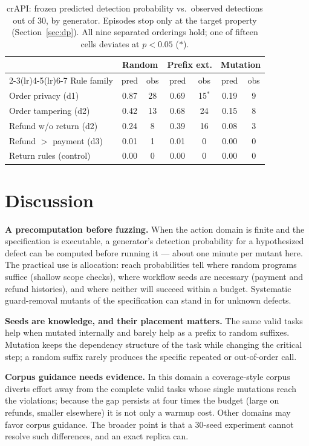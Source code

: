 \documentclass[conference]{IEEEtran}
\begin{document}
\begin{table}[t]
\caption{crAPI: frozen predicted detection probability vs.\ observed detections out of 30,
by generator. Episodes stop only at the target property (Section~\ref{sec:dp}). All nine
separated orderings hold; one of fifteen cells deviates at $p<0.05$ ($\ast$).}
\label{tab:crapi}
\centering
\footnotesize
\begin{tabular}{@{}lcccccc@{}}
\toprule
& \multicolumn{2}{c}{Random} & \multicolumn{2}{c}{Prefix ext.} & \multicolumn{2}{c}{Mutation} \\
\cmidrule(lr){2-3}\cmidrule(lr){4-5}\cmidrule(lr){6-7}
Rule family & pred & obs & pred & obs & pred & obs \\
\midrule
Order privacy (d1)        & 0.87 & 28 & 0.69 & 15$^\ast$ & 0.19 & 9 \\
Order tampering (d2)      & 0.42 & 13 & 0.68 & 24 & 0.15 & 8 \\
Refund w/o return (d2)    & 0.24 & 8  & 0.39 & 16 & 0.08 & 3 \\
Refund $>$ payment (d3)   & 0.01 & 1  & 0.01 & 0  & 0.00 & 0 \\
Return rules (control)    & 0.00 & 0  & 0.00 & 0  & 0.00 & 0 \\
\bottomrule
\end{tabular}
\end{table}

\section{Discussion}
\textbf{A precomputation before fuzzing.} When the action domain is finite and the
specification is executable, a generator's detection probability for a hypothesized defect
can be computed before running it --- about one minute per mutant here. The practical use
is allocation: reach probabilities tell where random programs suffice (shallow scope
checks), where workflow seeds are necessary (payment and refund histories), and where
neither will succeed within a budget. Systematic guard-removal mutants of the
specification can stand in for unknown defects.

\textbf{Seeds are knowledge, and their placement matters.} The same valid tasks help when
mutated internally and barely help as a prefix to random suffixes. Mutation keeps the
dependency structure of the task while changing the critical step; a random suffix rarely
produces the specific repeated or out-of-order call.

\textbf{Corpus guidance needs evidence.} In this domain a coverage-style corpus diverts
effort away from the complete valid tasks whose single mutations reach the violations;
because the gap persists at four times the budget (large on refunds, smaller elsewhere) it
is not only a warmup cost. Other domains may favor corpus guidance. The broader point is
that a 30-seed experiment cannot resolve such differences, and an exact replica can.
\end{document}
